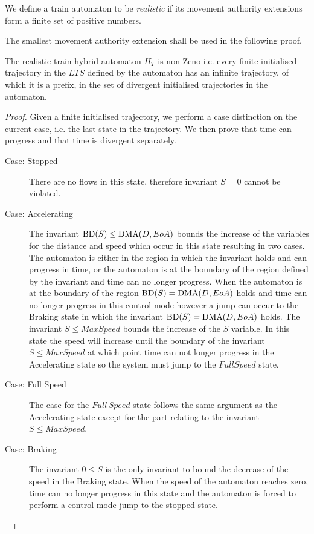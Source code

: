 \begin{mydef}
We define a train automaton to be \emph{realistic} if its movement authority extensions form a finite set of positive numbers.
\end{mydef}
The smallest movement authority extension shall be used in the following proof. 
\begin{mytheorem}
The realistic train hybrid automaton  $H_{T}$ is non-Zeno i.e. every finite initialised trajectory in the $LTS$ defined by the automaton has an infinite trajectory, of which it is a prefix, in the set of divergent initialised trajectories in the automaton.
\begin{proof}
Given a finite initialised trajectory, we perform a case distinction on the current case, i.e. the last state in the trajectory. We then prove that time can progress and that time is divergent separately.
\begin{description}
\item[Case: Stopped] There are no flows in this state, therefore invariant $S = 0$ cannot be violated. 

\item[Case: Accelerating] The invariant $\mathrm{BD}(S) \leq \mathrm{DMA}(D,EoA)$ bounds the increase of the variables for the distance and speed which occur in this state resulting in two cases. The automaton is either in the region in which the invariant holds and can progress in time, or the automaton is at the boundary of the region defined by the invariant and time can no longer progress. When the automaton is at the boundary of the region $\mathrm{BD}(S) = \mathrm{DMA}(D,EoA)$ holds and time can no longer progress in this control mode however a jump can occur to the Braking state in which the invariant $\mathrm{BD}(S) = \mathrm{DMA}(D,EoA)$ holds. The invariant $S \leq MaxSpeed$ bounds the increase of the $S$ variable. In this state the speed will increase until the boundary of the invariant $S \leq MaxSpeed$ at which point time can not longer progress in the Accelerating state so the system must jump to the $Full Speed$ state.


\item[Case: Full Speed] 
The case for the $Full \, Speed$ state follows the same argument as the Accelerating state except for the part relating to the invariant $S \leq MaxSpeed$.

\item[Case: Braking]
The invariant $0 \leq S$ is the only invariant to bound the decrease of the speed in the Braking state. When the speed of  the automaton reaches zero, time can no longer progress in this state and the automaton is forced to perform a control mode jump to the stopped state. 
\end{description}


\end{proof}
\end{mytheorem}
